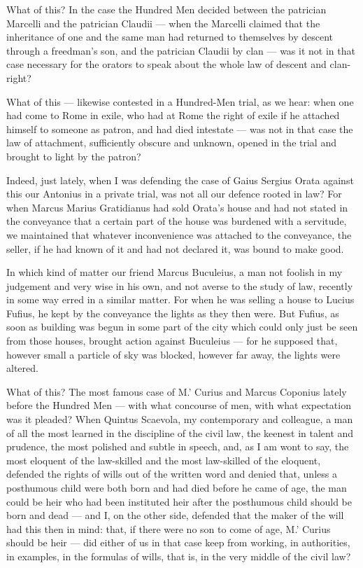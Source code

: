  What of this? In the case the Hundred Men decided between the patrician Marcelli and the patrician Claudii — when the Marcelli claimed that the inheritance of one and the same man had returned to themselves by descent through a freedman's son, and the patrician Claudii by clan — was it not in that case necessary for the orators to speak about the whole law of descent and clan-right?

 What of this — likewise contested in a Hundred-Men trial, as we hear: when one had come to Rome in exile, who had at Rome the right of exile if he attached himself to someone as patron, and had died intestate — was not in that case the law of attachment, sufficiently obscure and unknown, opened in the trial and brought to light by the patron?

 Indeed, just lately, when I was defending the case of Gaius Sergius Orata against this our Antonius in a private trial, was not all our defence rooted in law? For when Marcus Marius Gratidianus had sold Orata's house and had not stated in the conveyance that a certain part of the house was burdened with a servitude, we maintained that whatever inconvenience was attached to the conveyance, the seller, if he had known of it and had not declared it, was bound to make good.

 In which kind of matter our friend Marcus Buculeius, a man not foolish in my judgement and very wise in his own, and not averse to the study of law, recently in some way erred in a similar matter. For when he was selling a house to Lucius Fufius, he kept by the conveyance the lights as they then were. But Fufius, as soon as building was begun in some part of the city which could only just be seen from those houses, brought action against Buculeius — for he supposed that, however small a particle of sky was blocked, however far away, the lights were altered.

 What of this? The most famous case of M.' Curius and Marcus Coponius lately before the Hundred Men — with what concourse of men, with what expectation was it pleaded? When Quintus Scaevola, my contemporary and colleague, a man of all the most learned in the discipline of the civil law, the keenest in talent and prudence, the most polished and subtle in speech, and, as I am wont to say, the most eloquent of the law-skilled and the most law-skilled of the eloquent, defended the rights of wills out of the written word and denied that, unless a posthumous child were both born and had died before he came of age, the man could be heir who had been instituted heir after the posthumous child should be born and dead — and I, on the other side, defended that the maker of the will had this then in mind: that, if there were no son to come of age, M.' Curius should be heir — did either of us in that case keep from working, in authorities, in examples, in the formulas of wills, that is, in the very middle of the civil law?

